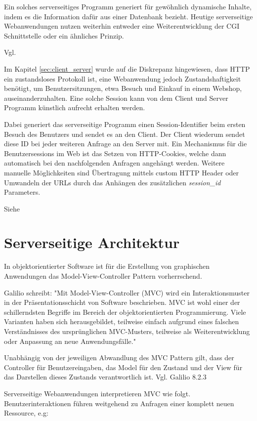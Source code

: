 Ein solches serverseitiges Programm generiert für gewöhnlich dynamische Inhalte, indem es die Information dafür aus einer Datenbank bezieht. Heutige serverseitige Webanwendungen nutzen weiterhin entweder eine Weiterentwicklung der CGI Schnittstelle oder ein ähnliches Prinzip.

Vgl. \citep[Kap. 1.1]{bekman}

Im Kapitel \ref{sec:client_server} wurde auf die Diskrepanz hingewiesen, dass HTTP ein zustandsloses Protokoll ist, eine Webanwendung jedoch Zustandshaftigkeit benötigt, um Benutzersitzungen, etwa Besuch und Einkauf in einem Webshop, auseinanderzuhalten. Eine solche Session kann von dem Client und Server Programm
künstlich aufrecht erhalten werden.

Dabei generiert das serverseitige Programm einen Session-Identifier beim ersten Besuch des Benutzers und sendet es an den Client. Der Client wiederum sendet diese  ID bei jeder weiteren Anfrage an den Server mit. Ein Mechanismus für die Benutzersessions im Web ist das Setzen von HTTP-Cookies, welche dann automatisch bei den nachfolgenden Anfragen angehängt werden. Weitere manuelle Möglichkeiten sind  Übertragung mittels custom HTTP Header oder Umwandeln der URLs durch das Anhängen des zusätzlichen \emph{session\_id} Parameters.

Siehe \citep[Stateful Web Applications]{launchschool}

\section{Serverseitige Architektur}

In objektorientierter Software ist für die Erstellung von graphischen Anwendungen das Model-View-Controller Pattern vorherrschend.

Galilio schreibt: "Mit Model-View-Controller (MVC) wird ein Interaktionsmuster in der Präsentationsschicht von Software beschrieben. MVC ist wohl einer der schillerndsten Begriffe im Bereich der objektorientierten Programmierung. Viele Varianten haben sich herausgebildet, teilweise einfach aufgrund eines falschen Verständnisses des ursprünglichen MVC-Musters, teilweise als Weiterentwicklung oder Anpassung an neue Anwendungsfälle."

Unabhängig von der jeweiligen Abwandlung des MVC Pattern gilt, dass der Controller für Benutzereingaben, das Model für den Zustand und der View für das Darstellen dieses Zustands verantwortlich ist. Vgl. Galilio  8.2.3

Serverseitige Webanwendungen interpretieren MVC wie folgt. Benutzerinteraktionen führen weitgehend zu Anfragen einer komplett neuen Ressource, e.g:

